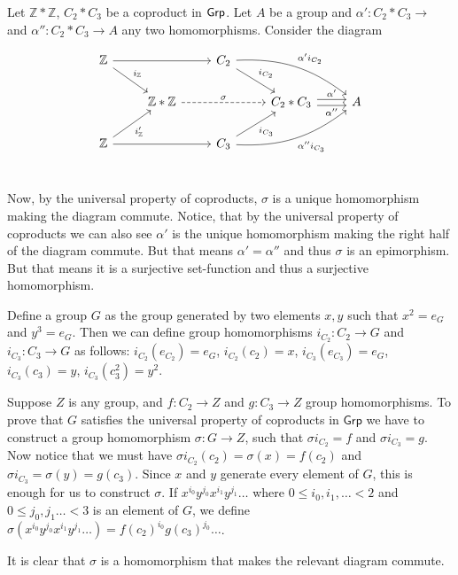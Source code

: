 \begin{solution}
	Let $\mathbb{Z} \ast \mathbb{Z}$, $C_2 \ast C_3$ be a coproduct in $\mathsf{Grp}$. Let $A$ be a group and $\alpha': C_2 \ast C_3 \to $ and $\alpha'': C_2 \ast C_3 \to A$ any two homomorphisms. Consider the diagram
	
	\begin{equation*}
		\begin{tikzcd}
			\mathbb{Z} 
			\arrow[rr]
			\arrow[dr, "i_\mathbb{Z}"] & & 
			C_2
			\arrow[dr, "i_{C_2}"]
			\arrow[drr, bend left=20, "\alpha' i_{C_2}"] & & \\
			& \mathbb{Z} \ast \mathbb{Z}
			\arrow[rr, dashrightarrow, "\sigma"] & & 
			C_2 \ast C_3 
			\arrow[r, shift left, "\alpha'"]
			\arrow[r, shift right, "\alpha''"'] & A \\
			\mathbb{Z}
			\arrow[rr]
			\arrow[ur, "i'_\mathbb{Z}"'] & & 
			C_3
			\arrow[ur, "i_{C_3}"']
			\arrow[urr, bend right=20, "\alpha'' i_{C_3}"'] & & \\
		\end{tikzcd}
	\end{equation*}
	
	Now, by the universal property of coproducts, $\sigma$ is a unique homomorphism making the diagram commute. Notice, that by the universal property of coproducts we can also see $\alpha'$ is the unique homomorphism making the right half of the diagram commute. But that means $\alpha' = \alpha''$ and thus $\sigma$ is an epimorphism. But that means it is a surjective set-function and thus a surjective homomorphism.
\end{solution}

\begin{problem}
\end{problem}

\begin{solution}
	Define a group $G$ as the group generated by two elements $x, y$ such that $x^2=e_G$ and $y^3=e_G$. Then we can define group homomorphisms $i_{C_2}: C_2 \to G$ and $i_{C_3}: C_3 \to G$ as follows: $i_{C_2}(e_{C_2})=e_G$, $i_{C_2}(c_2)=x$, $i_{C_3}(e_{C_3})=e_G$, $i_{C_3}(c_3)=y$, $i_{C_3}(c_3^2)=y^2$.
	
	Suppose $Z$ is any group, and $f: C_2 \to Z$ and $g: C_3 \to Z$ group homomorphisms. To prove that $G$ satisfies the universal property of coproducts in $\mathsf{Grp}$ we have to construct a group homomorphism $\sigma: G \to Z$, such that $\sigma i_{C_2} = f$ and $\sigma i_{C_3} = g$. Now notice that we must have $\sigma i_{C_2} (c_2) = \sigma(x) = f(c_2)$ and $\sigma i_{C_3} = \sigma(y) = g(c_3)$. Since $x$ and $y$ generate every element of $G$, this is enough for us to construct $\sigma$. If $x^{i_0} y^{j_0} x^{i_1} y^{j_1} \dots$ where $0 \leq i_0, i_1, \dots < 2$ and $0 \leq j_0, j_1 \dots < 3$ is an element of $G$, we define $\sigma(x^{i_0} y^{j_0} x^{i_1} y^{j_1} \dots)  = f(c_2)^{i_0} g(c_3)^{j_0} \dots$.
	
	It is clear that $\sigma$ is a homomorphism that makes the relevant diagram commute.
\end{solution}

